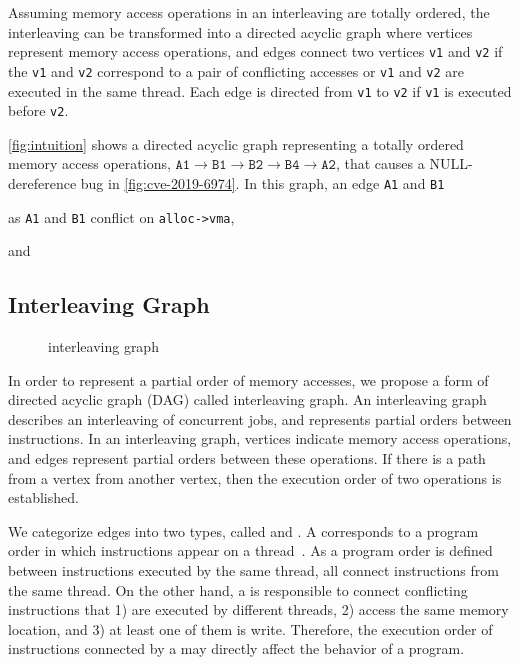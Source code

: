 %
Assuming memory access operations in an interleaving are totally
ordered, the interleaving can be transformed into a directed acyclic
graph where vertices represent memory access operations, and edges
connect two vertices \texttt{v1} and \texttt{v2} if the \texttt{v1}
and \texttt{v2} correspond to a pair of conflicting accesses or
\texttt{v1} and \texttt{v2} are executed in the same thread. Each edge
is directed from \texttt{v1} to \texttt{v2} if \texttt{v1} is executed
before \texttt{v2}.


\autoref{fig:intuition} shows a directed acyclic graph representing a
totally ordered memory access operations,
$\texttt{A1} \rightarrow \texttt{B1} \rightarrow \texttt{B2}
\rightarrow \texttt{B4} \rightarrow \texttt{A2}$, that causes a
NULL-dereference bug in \autoref{fig:cve-2019-6974}.
%
In this graph, an edge \texttt{A1} and \texttt{B1}

as \texttt{A1} and \texttt{B1} conflict on \texttt{alloc->vma},

and 







\subsection{Interleaving Graph}
\label{ss:coverage}

\begin{figure}[t]
  \caption{interleaving graph}
  \label{fig:interleaving-graph}
\end{figure}

In order to represent a partial order of memory accesses, we propose a
form of directed acyclic graph (DAG) called interleaving graph.
%
An interleaving graph describes an interleaving of concurrent jobs,
and represents partial orders between instructions.
%
In an interleaving graph, vertices indicate memory access operations,
and edges represent partial orders between these operations.
%
If there is a path from a vertex from another vertex, then the
execution order of two operations is established.

We categorize edges into two types, called \immutables and \mutables.
%
A \immutable corresponds to a program order in which instructions
appear on a thread~\cite{frightening, lkmm}. As a program order is
defined between instructions executed by the same thread, all
\immutables connect instructions from the same thread.
%
On the other hand, a \mutable is responsible to connect conflicting
instructions that 1) are executed by different threads, 2) access the
same memory location, and 3) at least one of them is write.
%
Therefore, the execution order of instructions connected by a \mutable
may directly affect the behavior of a program.


